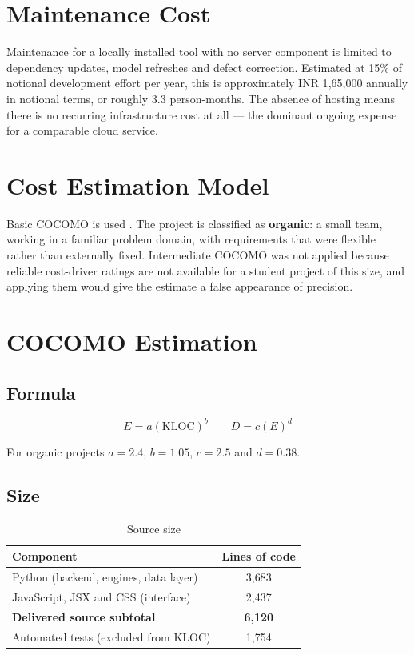 \documentclass[
12pt,
a4paper,
oneside
]{report}
\begin{document}
\section{Maintenance Cost}

Maintenance for a locally installed tool with no server component is limited to
dependency updates, model refreshes and defect correction. Estimated at 15\% of
notional development effort per year, this is approximately INR 1{,}65{,}000
annually in notional terms, or roughly 3.3 person-months. The absence of hosting
means there is no recurring infrastructure cost at all --- the dominant ongoing
expense for a comparable cloud service.

\section{Cost Estimation Model}

Basic COCOMO is used \cite{Boehm1981}. The project is classified as
\textbf{organic}: a small team, working in a familiar problem domain, with
requirements that were flexible rather than externally fixed. Intermediate
COCOMO was not applied because reliable cost-driver ratings are not available
for a student project of this size, and applying them would give the estimate a
false appearance of precision.

\section{COCOMO Estimation}
\label{sec:cocomo}

\subsection{Formula}

\[
E = a(\mathrm{KLOC})^{b}
\qquad
D = c(E)^{d}
\]

For organic projects $a = 2.4$, $b = 1.05$, $c = 2.5$ and $d = 0.38$.

\subsection{Size}

\begin{table}[H]
\centering
\begin{tabular}{|p{6cm}|c|}
\hline
\textbf{Component} & \textbf{Lines of code} \\
\hline
Python (backend, engines, data layer) & 3{,}683 \\
\hline
JavaScript, JSX and CSS (interface) & 2{,}437 \\
\hline
\textbf{Delivered source subtotal} & \textbf{6{,}120} \\
\hline
Automated tests (excluded from KLOC) & 1{,}754 \\
\hline
\end{tabular}
\caption{Source size}
\end{table}
\end{document}
